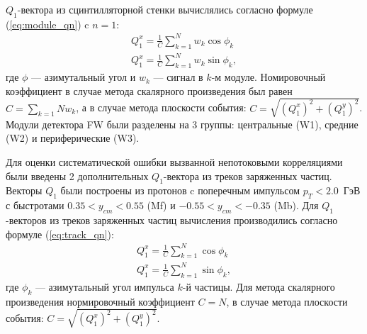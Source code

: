 $Q_1$-вектора из сцинтилляторной стенки вычислялись согласно формуле (\ref{eq:module_qn}) c $n=1$:
\begin{equation}
    \begin{align}
        Q_1^x = \frac{1}{C} \sum_{k=1}^N w_k \cos \phi_k \\
        Q_1^x = \frac{1}{C} \sum_{k=1}^N w_k \sin \phi_k,
    \end{align}
\end{equation}
где $\phi$ --- азимутальный угол и $w_k$ --- сигнал в $k$-м модуле. Номировочный коэффициент в случае метода скалярного произведения был равен $C=\sum_{k=1}{N} w_k$, а в случае метода плоскости события: $C = \sqrt{(Q_1^x)^2 + (Q_1^y)^2}$.
Модули детектора FW были разделены на 3 группы: центральные (W1), средние (W2) и периферические (W3).

Для оценки систематической ошибки вызванной непотоковыми корреляциями были введены 2 дополнительных $Q_1$-вектора из треков заряженных частиц.
Векторы $Q_1$ были построены из протонов c поперечным импульсом $p_T < 2.0$~ГэВ с быстротами $0.35 < y_{cm} < 0.55$ (Mf) и $-0.55 < y_{cm} < -0.35$ (Mb).
Для $Q_1$-векторов из треков заряженных частиц вычисления производились согласно формуле (\ref{eq:track_qn}):
\begin{equation}
    \begin{align}
        Q_1^x = \frac{1}{C} \sum_{k=1}^N \cos \phi_k \\
        Q_1^x = \frac{1}{C} \sum_{k=1}^N \sin \phi_k,
    \end{align}
\end{equation}
где $\phi_k$ --- азимутальный угол импульса $k$-й частицы. Для метода скалярного произведения нормировочный коэффициент $C=N$, в случае метода плоскости события: $C = \sqrt{(Q_1^x)^2 + (Q_1^y)^2}$.


